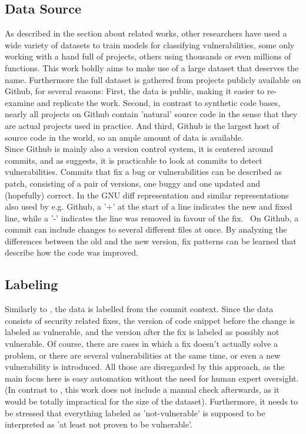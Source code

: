 \documentclass[
	a4paper,
	pagesize,
	pdftex,
	12pt,
	twoside, %
	BCOR=5mm, %
	ngerman,
	fleqn,
	final,
	]{scrartcl}
\begin{document}
\subsection{Data Source}\label{diff}
As described in the section about related works, other researchers have used a wide variety of datasets to train models for classifying vulnerabilities, some only working with a hand full of projects, others using thousands or even millions of functions. This work boldly aims to make use of a large dataset that deserves the name. Furthermore the full dataset is gathered from projects publicly available on Github, for several reasons: First, the data is public, making it easier to re-examine and replicate the work. Second, in contrast to synthetic code bases, nearly all projects on Github contain 'natural' source code in the sense that they are actual projects used in practice. And third, Github is the largest host of source code in the world, so an ample amount of data is available.\\
Since Github is mainly also a version control system, it is centered around commits, and as \cite{Zhou.2017} suggests, it is practicable to look at commits to detect vulnerabilities. Commits that fix a bug or vulnerabilities can be described as patch, consisting of a pair of versions, one buggy and one updated and (hopefully) correct. In the GNU diff representation and similar representations also used by e.g. Github, a '+' at the start of a line indicates the new and fixed line, while a '-' indicates the line was removed in favour of the fix.~\cite{Liu.2018} On Github, a commit can include changes to several different files at once. By analyzing the differences between the old and the new version, fix patterns can be learned that describe how the code was improved. \\

\subsection{Labeling}

Similarly to \cite{Li.2018}, the data is labelled from the commit context. Since the data consists of security related fixes, the version of code snippet before the change is labeled as vulnerable, and the version after the fix is labeled as possibly not vulnerable. Of course, there are cases in which a fix doesn't actually solve a problem, or there are several vulnerabilities at the same time, or even a new vulnerability is introduced. All those are disregarded by this approach, as the main focus here is easy automation without the need for human expert oversight. (In contrast to \cite{Li.2018}, this work does not include a manual check afterwards, as it would be totally impractical for the size of the dataset). Furthermore, it needs to be stressed that everything labeled as 'not-vulnerable' is supposed to be interpreted as 'at least not proven to be vulnerable'. 
\end{document}
